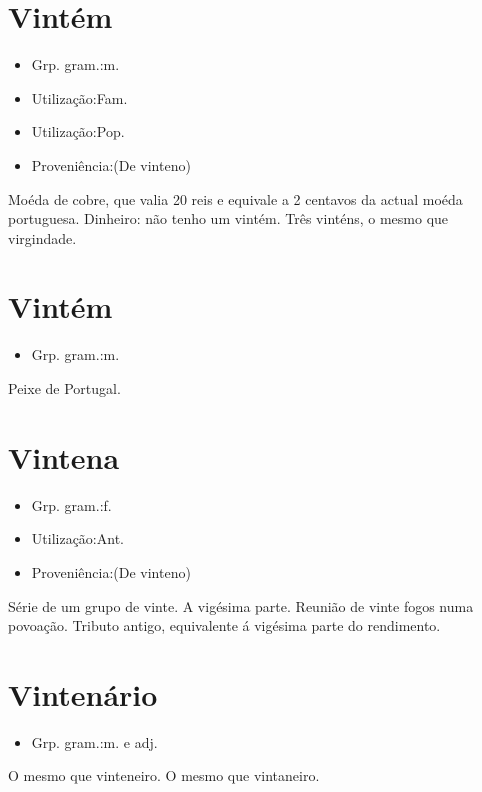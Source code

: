 \documentclass{article}
\begin{document}
\section{Vintém}
\begin{itemize}
\item {Grp. gram.:m.}
\end{itemize}
\begin{itemize}
\item {Utilização:Fam.}
\end{itemize}
\begin{itemize}
\item {Utilização:Pop.}
\end{itemize}
\begin{itemize}
\item {Proveniência:(De \textunderscore vinteno\textunderscore )}
\end{itemize}
Moéda de cobre, que valia 20 reis e equivale a 2 centavos da actual moéda portuguesa.
Dinheiro: \textunderscore não tenho um vintém.\textunderscore 
\textunderscore Três vinténs\textunderscore , o mesmo que \textunderscore virgindade\textunderscore .
\section{Vintém}
\begin{itemize}
\item {Grp. gram.:m.}
\end{itemize}
Peixe de Portugal.
\section{Vintena}
\begin{itemize}
\item {Grp. gram.:f.}
\end{itemize}
\begin{itemize}
\item {Utilização:Ant.}
\end{itemize}
\begin{itemize}
\item {Proveniência:(De \textunderscore vinteno\textunderscore )}
\end{itemize}
Série de um grupo de vinte.
A vigésima parte.
Reunião de vinte fogos numa povoação.
Tributo antigo, equivalente á vigésima parte do rendimento.
\section{Vintenário}
\begin{itemize}
\item {Grp. gram.:m.  e  adj.}
\end{itemize}
O mesmo que \textunderscore vinteneiro\textunderscore .
O mesmo que \textunderscore vintaneiro\textunderscore .
\end{document}
